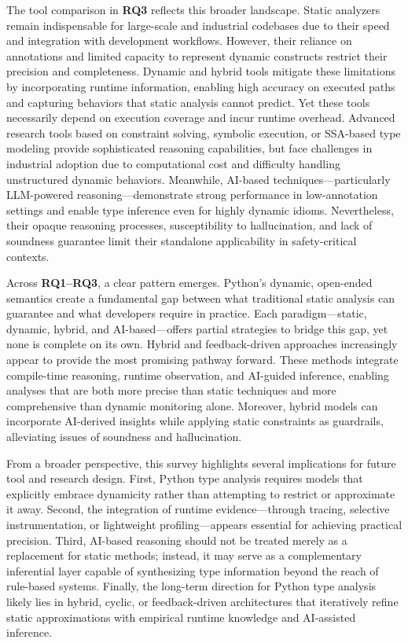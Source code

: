 The tool comparison in \textbf{RQ3} reflects this broader landscape.
Static analyzers remain indispensable for large-scale and industrial codebases
due to their speed and integration with development workflows.
However, their reliance on annotations and limited capacity to represent
dynamic constructs restrict their precision and completeness.
Dynamic and hybrid tools mitigate these limitations by incorporating runtime
information, enabling high accuracy on executed paths and capturing behaviors
that static analysis cannot predict.
Yet these tools necessarily depend on execution coverage and incur runtime
overhead.
Advanced research tools based on constraint solving, symbolic execution, or
SSA-based type modeling provide sophisticated reasoning capabilities, but face
challenges in industrial adoption due to computational cost and difficulty
handling unstructured dynamic behaviors.
Meanwhile, AI-based techniques—particularly LLM-powered reasoning—demonstrate
strong performance in low-annotation settings and enable type inference even
for highly dynamic idioms.
Nevertheless, their opaque reasoning processes, susceptibility to
hallucination, and lack of soundness guarantee limit their standalone
applicability in safety-critical contexts.

Across \textbf{RQ1–RQ3}, a clear pattern emerges.
Python’s dynamic, open-ended semantics create a fundamental gap between what
traditional static analysis can guarantee and what developers require in
practice.
Each paradigm—static, dynamic, hybrid, and AI-based—offers partial strategies
to bridge this gap, yet none is complete on its own.
Hybrid and feedback-driven approaches increasingly appear to provide the most
promising pathway forward. These methods integrate compile-time reasoning,
runtime observation, and AI-guided inference, enabling analyses that are both
more precise than static techniques and more comprehensive than dynamic
monitoring alone.
Moreover, hybrid models can incorporate AI-derived insights while applying
static constraints as guardrails, alleviating issues of soundness and
hallucination.

From a broader perspective, this survey highlights several implications for
future tool and research design.
First, Python type analysis requires models that explicitly embrace dynamicity
rather than attempting to restrict or approximate it away.
Second, the integration of runtime evidence—through tracing, selective
instrumentation, or lightweight profiling—appears essential for achieving
practical precision.
Third, AI-based reasoning should not be treated merely as a replacement for
static methods; instead, it may serve as a complementary inferential layer
capable of synthesizing type information beyond the reach of rule-based
systems.
Finally, the long-term direction for Python type analysis likely lies in
hybrid, cyclic, or feedback-driven architectures that iteratively refine static
approximations with empirical runtime knowledge and AI-assisted inference.

